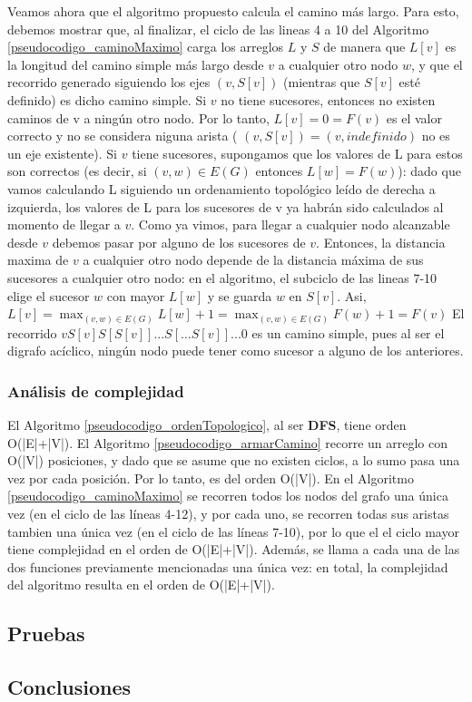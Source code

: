 Veamos ahora que el algoritmo propuesto calcula el camino m\'as largo. 
Para esto, debemos mostrar que, al finalizar,  el ciclo de las lineas 4 a 10 del Algoritmo \ref{pseudocodigo_caminoMaximo} carga los arreglos $L$ y $S$ de manera que $L[v]$ es la longitud del camino simple m\'as largo desde $v$ a cualquier otro nodo $w$, y que el recorrido generado siguiendo los ejes $(v, S[v])$ (mientras que $S[v]$ est\'e definido) es dicho camino simple. 
Si $v$ no tiene sucesores, entonces no existen caminos de v a ning\'un otro nodo. 
Por lo tanto, $L[v] = 0 = F(v)$ es el valor correcto y no se considera niguna arista ( $(v, S[v]) = (v, indefinido)$ no es un eje existente). 
Si $v$ tiene sucesores, supongamos que los valores de L para estos son correctos (es decir, si $(v, w) \in  E(G)$ entonces $L[w] = F(w)$):
dado que vamos calculando L siguiendo un ordenamiento topol\'ogico le\'ido de derecha a izquierda, los valores de L para los sucesores de v ya habr\'an sido calculados al momento de llegar a $v$. 
Como ya vimos, para llegar a cualquier nodo alcanzable desde $v$ debemos pasar por alguno de los sucesores de $v$.  Entonces, la distancia maxima de $v$ a cualquier otro nodo depende de la distancia m\'axima de sus sucesores a cualquier otro nodo: en el algoritmo, el subciclo de las lineas 7-10 elige el sucesor $w$ con mayor $L[w]$ y se guarda $w$ en $S[v]$. Asi, $L[v] = \max_{(v,w) \in E(G)}{L[w]+1} = \max_{(v,w) \in E(G)}{F(w) +1} = F(v) $
El recorrido $vS[v]S[S[v]]...S[...S[v]]...0$ es un camino simple, pues al ser el digrafo ac\'iclico, ning\'un nodo puede tener como sucesor a alguno de los anteriores.


\subsubsection{An\'alisis de complejidad}
 
El Algoritmo \ref{pseudocodigo_ordenTopologico}, al ser \textbf{DFS}, tiene orden O(|E|+|V|).
El Algoritmo \ref{pseudocodigo_armarCamino} recorre un arreglo con O(|V|) posiciones, y dado que se asume que no existen ciclos, a lo sumo pasa una vez por cada posici\'on. Por lo tanto, es del orden O(|V|).
En el Algoritmo \ref{pseudocodigo_caminoMaximo} se recorren todos los nodos del grafo una \'unica vez (en el ciclo de las l\'ineas 4-12), y por cada uno, se recorren todas sus aristas tambien una \'unica vez (en el ciclo de las l\'ineas 7-10), por lo que el el ciclo mayor tiene complejidad en el orden de O(|E|+|V|). Adem\'as, se llama a cada una de las dos funciones previamente mencionadas una \'unica vez: en total, la complejidad del algoritmo resulta en el orden de O(|E|+|V|).
 

\subsection{Pruebas}



\subsection{Conclusiones}

